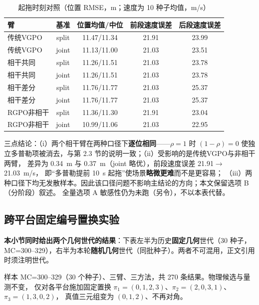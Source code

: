\documentclass[UTF8,a4paper,zihao=-4]{ctexart}
\begin{document}
\begin{table}[htbp]\centering\small
\caption{起拖时刻对照（位置 RMSE，m；速度为 10 种子均值，m/s）}\label{tab:sup-timebase}
\begin{tabular}{@{}lcccc@{}}\toprule
臂 & 基准 & 位置均值/中位 & 前段速度误差 & 后段速度误差 \\ \midrule
传统VGPO & split & 11.47/11.34 & 21.91 & 23.99 \\
传统VGPO & joint & 11.13/11.00 & 21.03 & 23.51 \\
相干共同 & split & 11.26/11.51 & 21.03 & 23.78 \\
相干共同 & joint & 11.26/11.51 & 21.03 & 23.78 \\
相干差分 & split & 11.76/11.77 & 21.03 & 25.37 \\
相干差分 & joint & 11.76/11.77 & 21.03 & 25.37 \\
RGPO非相干 & split & 11.36/11.30 & 21.91 & 23.04 \\
RGPO非相干 & joint & 10.99/11.06 & 21.03 & 22.95 \\
\bottomrule\end{tabular}\end{table}

三点结论：（i）两个相干臂在两种口径下\textbf{逐位相同}——$\rho=1$ 时 $(1-\rho)=0$
使独立多普勒项被消去，与第 2.3 节的说明一致；（ii）受影响的是传统VGPO与非相干两臂，
差异为 0.34~m 与 0.37~m（joint 略优），前段速度误差 21.91$\to$21.03~m/s，
即“多普勒提前 10~s 起拖”使场景\textbf{略微更难}而不是更容易；
（iii）两种口径下均无发散样本。因此该口径问题不影响主结论的方向；本文保留选项 B（分阶段）叙述。
全量选项 A 敏感性仍为未跑（另令），不以本表代替。

\subsection{跨平台固定编号置换实验}\label{sup:perm-audit}

\textbf{本小节同时给出两个几何世代的结果}：下表左半为历史\textbf{固定几何}世代（30 种子，MC=300--329），右半为本轮\textbf{随机几何}世代（同批种子）。两者不可混用，正文引用时须注明世代。

样本 MC=300--329（30 个种子）、三臂、三方法，共 270 条结果。物理候选与量测不变，
仅对各平台施加固定置换 $\pi_1=(0,1,2,3)$、$\pi_2=(2,0,3,1)$、$\pi_3=(1,3,0,2)$，
真值三元组变为 $(0,1,2)$、不再对角。
\end{document}
